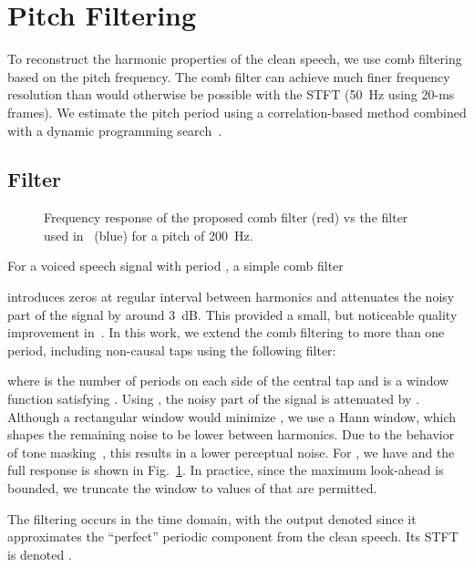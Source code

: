 \documentclass[english]{article}
\begin{document}
\section{Pitch Filtering}

\label{sec:pitch-filtering}

To reconstruct the harmonic properties of the clean speech, we use
comb filtering based on the pitch frequency. The comb filter can achieve
much finer frequency resolution than would otherwise be possible with
the STFT (50~Hz using 20\nobreakdash-ms frames). We estimate the
pitch period using a correlation-based method combined with a dynamic
programming search~\cite{RAPT}.


\subsection{Filter}

\begin{figure}
\vspace{-0.20em}\vspace{-0.5em}\caption{Frequency response of the proposed comb filter (red) vs the filter
used in~\cite{valin2018rnnoise} (blue) for a pitch of 200~Hz.\label{fig:Frequency-response-pitch}}
\end{figure}


For a voiced speech signal with period , a simple comb filter

introduces zeros at regular interval between harmonics and attenuates
the noisy part of the signal by around 3~dB. This provided a small,
but noticeable quality improvement in~\cite{valin2018rnnoise}. In
this work, we extend the comb filtering to more than one period, including
non-causal taps using the following filter:

where  is the number of periods on each side of the central tap
and  is a window function satisfying . Using
, the noisy part of the signal is attenuated
by  . Although a rectangular window
would minimize , we use a Hann window, which shapes
the remaining noise to be lower between harmonics. Due to the behavior
of tone masking~\cite{moore2012introduction}, this results in a
lower perceptual noise. For , we have 
and the full response is shown in Fig.~\ref{fig:Frequency-response-pitch}.
In practice, since the maximum look-ahead is bounded, we truncate
the window  to values of  that are permitted. 

The filtering occurs in the time domain, with the output denoted 
since it approximates the ``perfect'' periodic component 
from the clean speech. Its STFT is denoted . 
\end{document}
